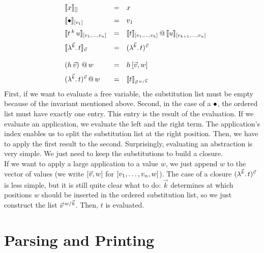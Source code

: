 \documentclass[submission,copyright,creativecommons]{eptcs}
\begin{document}
\[ 
\begin{array}{llll}
& \ev x {\emptyVec} & = & x \\ \noalign{\medskip}
& \ev \ovar {\ve{v_1}} & = & v_1 \\  \noalign{\medskip}
& \ev {t \oapp k u} {\ve{v_1, \ldots, v_n}} & = & {\ev t {\ve{v_1, \ldots, v_k}}} \ap {\ev u {\ve{v_{k+1}, \ldots, v_n}}} \\  \noalign{\medskip}
& \ev {\LaO {\vec k} t}  {\vec v} & = & \Val {\vec k} t {\vec v} \\  
\\ 
& \pa{h \sspace \vec v} \ap w & = & h \sspace \ve{\vec v, w} 
\\ \noalign{\medskip}
& \Val{\vec k} t {\vec v}   \ap w & = & \ev t {\multiinsert{\vec v}{\vec k}{w}}
\end{array}
\]
First, if we want to evaluate a free variable, the substitution list must be empty because of the invariant mentioned above. 
Second, in the case of a $\ovar$, the ordered list must have exactly one entry. This entry is the result of the evaluation. 
If we evaluate an application, we evaluate the left and the right term. The application's index enables us to split the substitution list at the right position. Then, we have to apply the first result to the second. 
Surprisingly, evaluating an abstraction is very simple. We just need to keep the substitutions to build a closure. \\
If we want to apply a large application to a value $w$, we just append $w$ to the vector of values (we write $\ve{\vec v, w}$ for $\ve{v_1, \ldots, v_n, w}$). 
The case of a closure $\Val {\vec k} t {\vec v}$ is less simple, but it is still quite clear what to do: $\vec k$ determines at which positions $w$ should be inserted in the ordered substitution list, so we just construct the list $\multiinsert {\vec v} {\vec k} w$. Then, $t$ is evaluated.


\section{Parsing and Printing}
\end{document}
